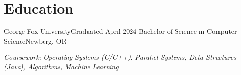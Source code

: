 \section{Education}
  \resumeSubHeadingListStart
    \resumeSubheading
        {George Fox University}{Graduated April 2024}
        {Bachelor of Science in Computer Science}{Newberg, OR}
        {\item{\small{\textit{Coursework: Operating Systems (C/C++), Parallel Systems, Data Structures (Java), Algorithms, Machine Learning}}}}
  \resumeSubHeadingListEnd
